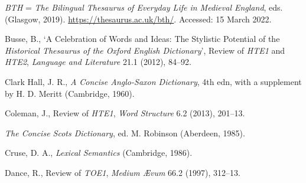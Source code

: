 \begin{list}{}
\item %
\textit{BTH} = \textit{The Bilingual Thesaurus of Everyday Life in Medieval England}, eds. (Glasgow, 2019). \url{https://thesaurus.ac.uk/bth/}. Accessed: 15 March 2022.

\item %
Busse, B., `A Celebration of Words and Ideas: The Stylistic Potential of the \textit{Historical Thesaurus of the Oxford English Dictionary}', Review of \textit{HTE1} and \textit{HTE2}, \textit{Language and Literature} 21.1 (2012), 84–92.


\item %
Clark Hall, J. R., \textit{A Concise Anglo-Saxon Dictionary}, 4th edn, with a supplement by H. D. Meritt (Cambridge, 1960).


\item %
Coleman, J., Review of \textit{HTE1}, \textit{Word Structure} 6.2 (2013), 201–13.

\item %
\textit{The Concise Scots Dictionary}, ed. M. Robinson (Aberdeen, 1985).


\item %
Cruse, D. A., \textit{Lexical Semantics} (Cambridge, 1986).


\item %
Dance, R., Review of \textit{TOE1}, \textit{Medium Ævum} 66.2 (1997), 312–13.



\end{list}
